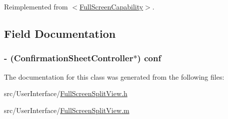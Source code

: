 Reimplemented from \hyperlink{protocol_full_screen_capability-p_af4ae7f6ecd780937432be3efe4198766}{$<$\-Full\-Screen\-Capability$>$}.



\subsection{Field Documentation}
\hypertarget{interface_full_screen_split_view_a9056de75af0a646581cf04b547299d2c}{
\subsubsection[{conf}]{\setlength{\rightskip}{0pt plus 5cm}-\/ ({\bf Confirmation\-Sheet\-Controller}$\ast$) conf\hspace{0.3cm}{\ttfamily [protected]}}}\label{interface_full_screen_split_view_a9056de75af0a646581cf04b547299d2c}


The documentation for this class was generated from the following files\-:\begin{DoxyCompactItemize}
\item 
src/\-User\-Interface/\hyperlink{_full_screen_split_view_8h}{Full\-Screen\-Split\-View.\-h}\item 
src/\-User\-Interface/\hyperlink{_full_screen_split_view_8m}{Full\-Screen\-Split\-View.\-m}\end{DoxyCompactItemize}
